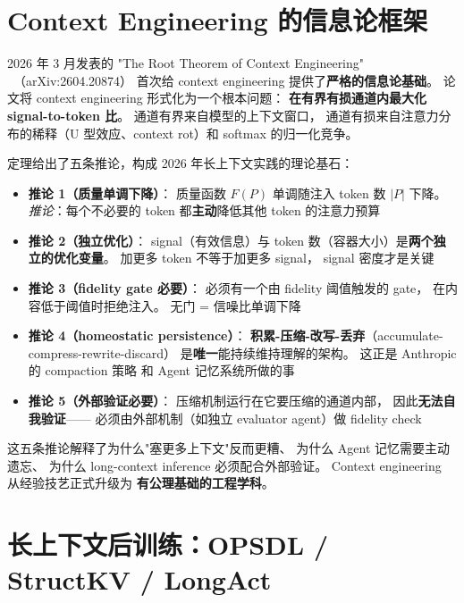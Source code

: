 \section{Context Engineering 的信息论框架}
\label{sec:context-engineering-theory}

2026 年 3 月发表的
"The Root Theorem of Context Engineering"
~\cite{contextroottheorem2026}（arXiv:2604.20874）
首次给 context engineering 提供了\textbf{严格的信息论基础}。
论文将 context engineering 形式化为一个根本问题：
\textbf{在有界有损通道内最大化 signal-to-token 比}。
通道有界来自模型的上下文窗口，
通道有损来自注意力分布的稀释（U 型效应、context rot）和
softmax 的归一化竞争。

定理给出了五条推论，构成 2026 年长上下文实践的理论基石：

\begin{itemize}[noitemsep]
  \item \textbf{推论 1（质量单调下降）}：
        质量函数 $F(P)$ 单调随注入 token 数 $|P|$ 下降。
        \emph{推论}：每个不必要的 token 都\textbf{主动}降低其他 token 的注意力预算
  \item \textbf{推论 2（独立优化）}：
        signal（有效信息）与 token 数（容器大小）是\textbf{两个独立的优化变量}。
        加更多 token 不等于加更多 signal，
        signal 密度才是关键
  \item \textbf{推论 3（fidelity gate 必要）}：
        必须有一个由 fidelity 阈值触发的 gate，
        在内容低于阈值时拒绝注入。
        无门 = 信噪比单调下降
  \item \textbf{推论 4（homeostatic persistence）}：
        \textbf{积累-压缩-改写-丢弃}（accumulate-compress-rewrite-discard）
        是\textbf{唯一}能持续维持理解的架构。
        这正是 Anthropic 的 compaction 策略
        和 Agent 记忆系统所做的事
  \item \textbf{推论 5（外部验证必要）}：
        压缩机制运行在它要压缩的通道内部，
        因此\textbf{无法自我验证}——
        必须由外部机制（如独立 evaluator agent）做 fidelity check
\end{itemize}

这五条推论解释了为什么"塞更多上下文"反而更糟、
为什么 Agent 记忆需要主动遗忘、
为什么 long-context inference 必须配合外部验证。
Context engineering 从经验技艺正式升级为
\textbf{有公理基础的工程学科}。

\section{长上下文后训练：OPSDL / StructKV / LongAct}
\label{sec:long-context-posttrain}

